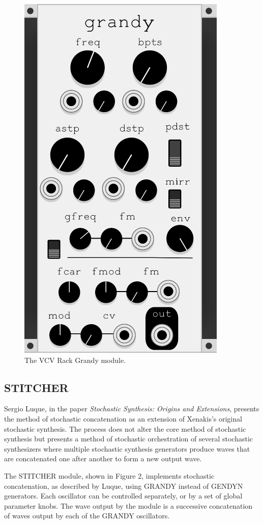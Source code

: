 \documentclass[10pt]{article}
\begin{document}
\begin{figure}
  \caption{The VCV Rack Grandy module.}
  \centering
    \includegraphics[height=0.25\textheight]{grandy}
\end{figure}

\subsection{STITCHER}
Sergio Luque, in the paper \textit{Stochastic Synthesis: Origins and Extensions}, presents the method of stochastic concatenation as an extension of Xenakis's original stochastic synthesis.\citep{sergio2006} The process does not alter the core method of stochastic synthesis but presents a method of stochastic orchestration of several stochastic synthesizers where multiple stochastic synthesis generators produce waves that are concatenated one after another to form a new output wave. 

The STITCHER module, shown in Figure 2, implements stochastic concatenation, as described by Luque, using GRANDY instead of GENDYN generators. Each oscillator can be controlled separately, or by a set of global parameter knobs. The wave output by the module is a successive concatenation of waves output by each of the GRANDY oscillators.
\end{document}

